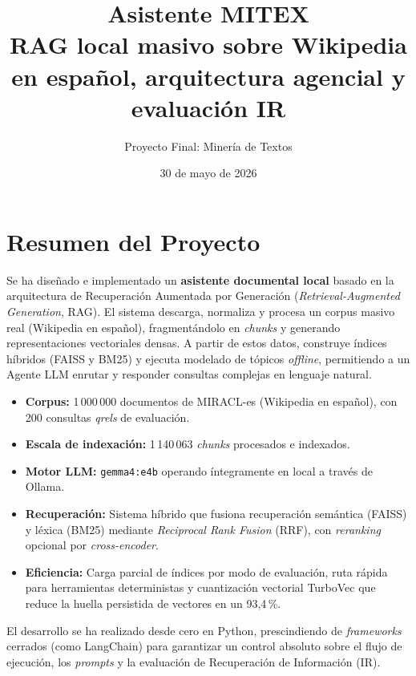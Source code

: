 \documentclass[11pt,a4paper]{article}
\title{\textbf{Asistente MITEX}\\[6pt]\large RAG local masivo sobre Wikipedia en español, arquitectura agencial y evaluación IR}
\author{Proyecto Final: Minería de Textos}
\date{30 de mayo de 2026}
\newcommand{\code}[1]{\texttt{#1}}
\begin{document}
\maketitle
\tableofcontents
\newpage

\section{Resumen del Proyecto}

Se ha diseñado e implementado un \textbf{asistente documental local} basado en la arquitectura de Recuperación Aumentada por Generación (\textit{Retrieval-Augmented Generation}, RAG). El sistema descarga, normaliza y procesa un corpus masivo real (Wikipedia en español), fragmentándolo en \textit{chunks} y generando representaciones vectoriales densas. A partir de estos datos, construye índices híbridos (FAISS y BM25) y ejecuta modelado de tópicos \textit{offline}, permitiendo a un Agente LLM enrutar y responder consultas complejas en lenguaje natural.

\begin{itemize}
  \item \textbf{Corpus:} 1\,000\,000 documentos de MIRACL-es (Wikipedia en español), con 200 consultas \textit{qrels} de evaluación.
  \item \textbf{Escala de indexación:} 1\,140\,063 \textit{chunks} procesados e indexados.
  \item \textbf{Motor LLM:} \code{gemma4:e4b} operando íntegramente en local a través de Ollama.
  \item \textbf{Recuperación:} Sistema híbrido que fusiona recuperación semántica (FAISS) y léxica (BM25) mediante \textit{Reciprocal Rank Fusion} (RRF), con \textit{reranking} opcional por \textit{cross-encoder}.
  \item \textbf{Eficiencia:} Carga parcial de índices por modo de evaluación, ruta rápida para herramientas deterministas y cuantización vectorial TurboVec que reduce la huella persistida de vectores en un 93,4\,\%.
\end{itemize}

El desarrollo se ha realizado desde cero en Python, prescindiendo de \textit{frameworks} cerrados (como LangChain) para garantizar un control absoluto sobre el flujo de ejecución, los \textit{prompts} y la evaluación de Recuperación de Información (IR).
\end{document}
